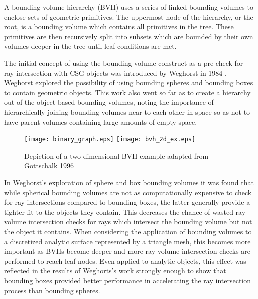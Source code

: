 A bounding volume hierarchy (BVH) uses a series of linked bounding volumes to
enclose sets of geometric primitives. The uppermost node of the hierarchy, or
the root, is a bounding volume which contains all primitives in the tree. These
primitives are then recursively split into subsets which are bounded by their
own volumes deeper in the tree until leaf conditions are met.

The initial concept of using the bounding volume construct as a pre-check for
ray-intersection with CSG objects was introduced by Weghorst in 1984
\cite{Weghorst_1984}. Weghorst explored the possibility of using bounding
spheres and bounding boxes to contain geometric objects. This work also went so
far as to create a hierarchy out of the object-based bounding volumes, noting the
importance of hierarchically joining bounding volumes near to each other in space
so as not to have parent volumes containing large amounts of empty space.

\begin{figure}[H]
  \centering
  \texttt{[image: binary\_graph.eps]}
  \texttt{[image: bvh\_2d\_ex.eps]}
  \caption[A 2D bounding volume hierarchy example.]{Depiction of a two dimensional BVH example adapted from Gottschalk 1996 \cite{Gottschalk_1996}}
  \label{fig:2D_bvh}
\end{figure}

In Weghorst's exploration of sphere and box bounding volumes it was found that
while spherical bounding volumes are not as computationally expensive to check
for ray intersections compared to bounding boxes, the latter generally provide a
tighter fit to the objects they contain. This decreases the chance of wasted
ray-volume intersection checks for rays which intersect the bounding volume but
not the object it contains. When considering the application of bounding volumes
to a discretized analytic surface represented by a triangle mesh, this becomes
more important as BVHs become deeper and more ray-volume intersection checks are
performed to reach leaf nodes. Even applied to analytic objects, this effect was
reflected in the results of Weghorts's work strongly enough to show that
bounding boxes provided better performance in accelerating the ray intersection
process than bounding spheres.

